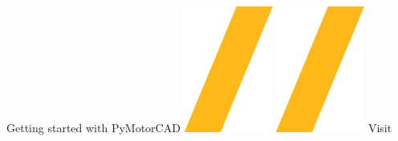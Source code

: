 \documentclass[landscape]{article}
\begin{document}
\vspace{-0.30cm}
\noindent\makebox[\linewidth]{\rule{\paperwidth}{4pt}}
\begin{center}
Getting started with PyMotorCAD \includegraphics[height=\fontcharht\font`\S]{slash.png} \href{https://github.com/ansys/pymotorcad}{\color{blue}{PyMotorCAD on GitHub}}
\includegraphics[height=\fontcharht\font`\S]{slash.png} Visit 
\end{center}
\end{document}
